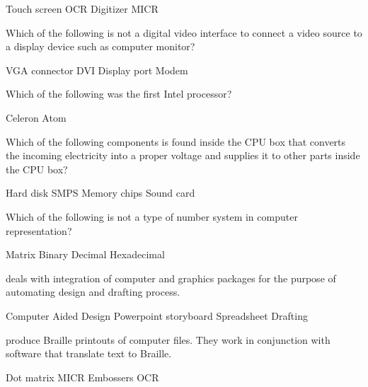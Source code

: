 \documentclass[a4paper]{exam}
\begin{document}
\begin{questions}
\begin{oneparchoices}
    \choice Touch screen
    \choice OCR
    \choice Digitizer
    \choice MICR
\end{oneparchoices}

\question Which of the following is not a digital video interface to connect a video source to a display device such as computer monitor?

\begin{oneparchoices}
    \choice VGA connector
    \choice DVI
    \choice Display port
    \choice Modem
\end{oneparchoices}

\question Which of the following was the first Intel processor?

\begin{oneparchoices}
    \choice Celeron
    \choice Atom
\end{oneparchoices}

\question Which of the following components is found inside the CPU box that converts the incoming electricity into a proper voltage and supplies it to other parts inside the CPU box?

\begin{oneparchoices}
    \choice Hard disk
    \choice SMPS
    \choice Memory chips
    \choice Sound card
\end{oneparchoices}

\question Which of the following is not a type of number system in computer representation?

\begin{oneparchoices}
    \choice Matrix
    \choice Binary
    \choice Decimal
    \choice Hexadecimal
\end{oneparchoices}

\question \fillin[100] deals with integration of computer and graphics packages for the purpose of automating design and drafting process.

\begin{oneparchoices}
    \choice Computer Aided Design
    \choice Powerpoint storyboard
    \choice Spreadsheet
    \choice Drafting
\end{oneparchoices}

\question \fillin[100] produce Braille printouts of computer files. They work in conjunction with software that translate text to Braille.

\begin{oneparchoices}
    \choice Dot matrix
    \choice MICR
    \choice Embossers
    \choice OCR
\end{oneparchoices}


\end{questions}
\end{document}
